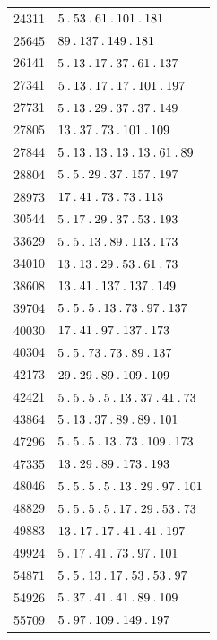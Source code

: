 \begin{longtable}{@{}r|l@{}}
24311 & $5\pdot 53\pdot 61\pdot 101\pdot 181$\\
25645 & $89\pdot 137\pdot 149\pdot 181$\\
26141 & $5\pdot 13\pdot 17\pdot 37\pdot 61\pdot 137$\\
27341 & $5\pdot 13\pdot 17\pdot 17\pdot 101\pdot 197$\\
27731 & $5\pdot 13\pdot 29\pdot 37\pdot 37\pdot 149$\\
27805 & $13\pdot 37\pdot 73\pdot 101\pdot 109$\\
27844 & $5\pdot 13\pdot 13\pdot 13\pdot 13\pdot 61\pdot 89$\\
28804 & $5\pdot 5\pdot 29\pdot 37\pdot 157\pdot 197$\\
28973 & $17\pdot 41\pdot 73\pdot 73\pdot 113$\\
30544 & $5\pdot 17\pdot 29\pdot 37\pdot 53\pdot 193$\\
33629 & $5\pdot 5\pdot 13\pdot 89\pdot 113\pdot 173$\\
34010 & $13\pdot 13\pdot 29\pdot 53\pdot 61\pdot 73$\\
38608 & $13\pdot 41\pdot 137\pdot 137\pdot 149$\\
39704 & $5\pdot 5\pdot 5\pdot 13\pdot 73\pdot 97\pdot 137$\\
40030 & $17\pdot 41\pdot 97\pdot 137\pdot 173$\\
40304 & $5\pdot 5\pdot 73\pdot 73\pdot 89\pdot 137$\\
42173 & $29\pdot 29\pdot 89\pdot 109\pdot 109$\\
42421 & $5\pdot 5\pdot 5\pdot 5\pdot 13\pdot 37\pdot 41\pdot 73$\\
43864 & $5\pdot 13\pdot 37\pdot 89\pdot 89\pdot 101$\\
47296 & $5\pdot 5\pdot 5\pdot 13\pdot 73\pdot 109\pdot 173$\\
47335 & $13\pdot 29\pdot 89\pdot 173\pdot 193$\\
48046 & $5\pdot 5\pdot 5\pdot 5\pdot 13\pdot 29\pdot 97\pdot 101$\\
48829 & $5\pdot 5\pdot 5\pdot 5\pdot 17\pdot 29\pdot 53\pdot 73$\\
49883 & $13\pdot 17\pdot 17\pdot 41\pdot 41\pdot 197$\\
49924 & $5\pdot 17\pdot 41\pdot 73\pdot 97\pdot 101$\\
54871 & $5\pdot 5\pdot 13\pdot 17\pdot 53\pdot 53\pdot 97$\\
54926 & $5\pdot 37\pdot 41\pdot 41\pdot 89\pdot 109$\\
55709 & $5\pdot 97\pdot 109\pdot 149\pdot 197$\\

\end{longtable}
